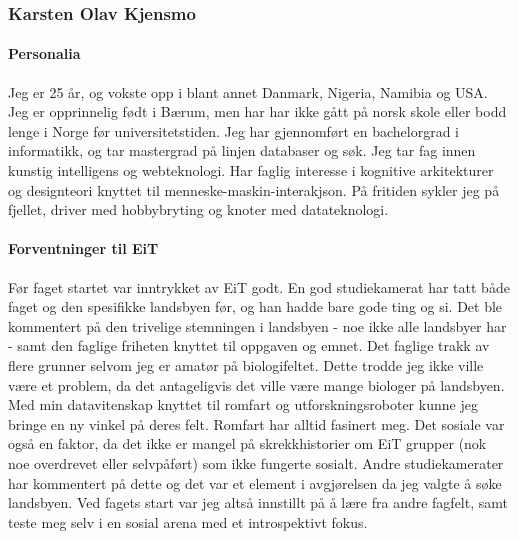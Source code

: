 \subsubsection{Karsten Olav Kjensmo}

\paragraph{Personalia}
Jeg er 25 år, og vokste opp i blant annet Danmark, Nigeria, Namibia og USA. Jeg er opprinnelig født i Bærum, men har har ikke gått på norsk skole eller bodd lenge i Norge før universitetstiden. Jeg har gjennomført en bachelorgrad i informatikk, og tar mastergrad på linjen databaser og søk. Jeg tar fag innen kunstig intelligens og webteknologi. Har faglig interesse i kognitive arkitekturer og designteori knyttet til menneske-maskin-interakjson. På fritiden sykler jeg på fjellet, driver med hobbybryting og knoter med datateknologi. 

\paragraph{Forventninger til EiT}
Før faget startet var inntrykket av EiT godt. En god studiekamerat har tatt både faget og den spesifikke landsbyen før, og han hadde bare gode ting og si. Det ble kommentert på den trivelige stemningen i landsbyen - noe ikke alle landsbyer har - samt den faglige friheten knyttet til oppgaven og emnet. Det faglige trakk av flere grunner  selvom jeg er amatør på biologifeltet. Dette trodde jeg ikke ville være et problem, da det antageligvis det ville være mange biologer på landsbyen.  Med min datavitenskap knyttet til romfart og utforskningsroboter kunne jeg bringe en ny vinkel på deres felt. Romfart har alltid fasinert meg. Det sosiale var også en faktor, da det ikke er mangel på skrekkhistorier om EiT grupper (nok noe overdrevet eller selvpåført) som ikke fungerte sosialt. Andre studiekamerater har kommentert på dette og det var et element i avgjørelsen da jeg valgte å søke landsbyen. Ved fagets start var jeg altså innstillt på å lære fra andre fagfelt, samt teste meg selv i en sosial arena med et introspektivt fokus. 
